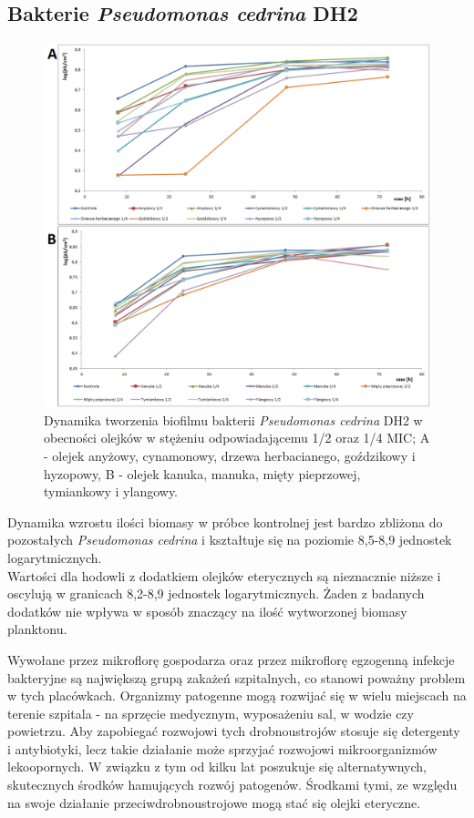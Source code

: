 \documentclass[11pt,a4paper]{report}
\begin{document}
\subsection{Bakterie \textit{Pseudomonas cedrina} DH2}
\begin{figure}[!h]
\begin{center}
\includegraphics[scale=0.55]{img/dh2-c.png}
\caption{Dynamika tworzenia biofilmu bakterii \textit{Pseudomonas cedrina} DH2 w obecności olejków w stężeniu odpowiadającemu 1/2 oraz 1/4 MIC; A - olejek anyżowy, cynamonowy, drzewa herbacianego, goździkowy i hyzopowy, B - olejek kanuka, manuka, mięty pieprzowej, tymiankowy i ylangowy.}\label{dh2-c}
\end{center} 
\end{figure}

\clearpage
Dynamika wzrostu ilości biomasy w próbce kontrolnej jest bardzo zbliżona do pozostałych \textit{Pseudomonas cedrina} i kształtuje się na poziomie 8,5-8,9 jednostek logarytmicznych.\\
Wartości dla hodowli z dodatkiem olejków eterycznych są nieznacznie niższe i oscylują w granicach 8,2-8,9 jednostek logarytmicznych. Żaden z badanych dodatków nie wpływa w sposób znaczący na ilość wytworzonej biomasy planktonu.
\clearpage

Wywołane przez mikroflorę gospodarza oraz przez mikroflorę egzogenną infekcje bakteryjne są największą grupą zakażeń szpitalnych, co stanowi poważny problem w tych placówkach. Organizmy patogenne mogą rozwijać się w wielu miejscach na terenie szpitala - na sprzęcie medycznym, wyposażeniu sal, w wodzie czy powietrzu. Aby zapobiegać rozwojowi tych drobnoustrojów stosuje się detergenty i antybiotyki, lecz takie działanie może sprzyjać rozwojowi mikroorganizmów lekoopornych. 
W związku z tym od kilku lat poszukuje się alternatywnych, skutecznych środków hamujących rozwój patogenów. Środkami tymi, ze względu na swoje działanie przeciwdrobnoustrojowe mogą stać się olejki eteryczne\cite{zakszpit16, czaczyk}.
\end{document}
